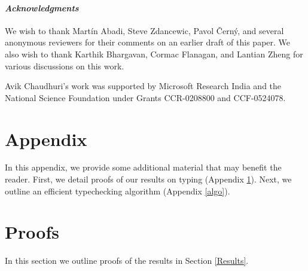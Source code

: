 \documentclass{sigplanconf}
\begin{document}
\paragraph{\em Acknowledgments}
We wish to thank Mart\'in Abadi, Steve Zdan\-cewic, Pavol \v{C}ern\'y,  and several anonymous reviewers for their comments on an earlier draft of this paper. We also wish to thank 
Karthik Bhargavan, Cormac Flanagan, and Lantian Zheng for various discussions on this work. 

Avik Chaudhuri's work was supported by Microsoft Research India and the National Science
Foundation under Grants CCR-0208800 and CCF-0524078.







\appendix















\section*{Appendix}
In this appendix, we provide some additional material that may benefit the reader. First, we detail proofs of our results on typing (Appendix \ref{proofs}). Next, we outline an efficient typechecking algorithm (Appendix \ref{algo}).

\section{Proofs}\label{proofs}
\noindent
In this section we outline proofs of the results in Section \ref{Results}. 
\end{document}
